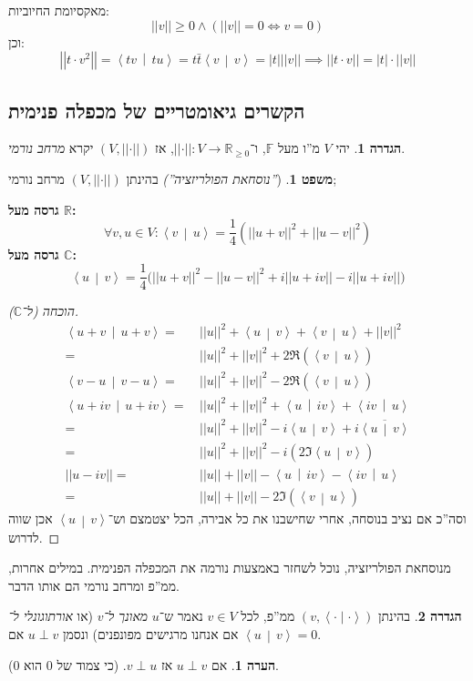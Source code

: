 \documentclass[a4paper]{article}
\newcommand\R     {\mathbb{R}}
\newcommand\C     {\mathbb{C}}
\newcommand\ra    {\rangle}
\newcommand\la    {\langle}
\newcommand\ol    {\overline}
\newcommand\F         {\mathbb{F}}
\newcommand\co        {\colon}
\newcommand\norm[1]   {\left \vert \left \vert #1 \right \vert \right \vert}
\newcommand\snorm     {\left \vert \left \vert \cdot \right \vert \right \vert}
\newcommand\smut      {\left \la \cdot \mid \cdot \right \ra}
\newcommand\mut [2]   {\left \la #1 \,\middle\vert\, #2 \right \ra}
\newcommand\sof[1]    {\left | #1 \right |}
\theoremstyle{definition}
\newtheorem{Theorem}{משפט}
\newtheorem{definition}{הגדרה}
\newtheorem{Remark}{הערה}
\newcommand\theo  [1] {\begin{Theorem}#1\end{Theorem}}
\newcommand\defi  [1] {\begin{definition}#1\end{definition}}
\newcommand\rmark [1] {\begin{Remark}#1\end{Remark}}
\begin{document}
	מאקסיומת החיוביות: 
	\[ \norm{v} \ge 0 \land (\norm{v} = 0 \iff v = 0) \]
	וכן: 
	\[ \norm{t \cdot v^2} = \mut{tv}{tu} = t \bar t\mut{v}{v} = \sof{t}\norm{v} \implies \norm{t \cdot v} = \sof{t} \cdot \norm{v} \]
	
	\newpage
	\subsection{הקשרים גיאומטריים של מכפלה פנימית}
	\defi{יהי $V$ מ''ו מעל $\F$, ו־$\snorm \co V \to \R_{\ge 0}$, אז $(V, \snorm)$ יקרא \textit{מרחב נורמי}. }
	\theo{(\textit{''נוסחאת הפולריזציה'')} בהינתן $(V, \snorm)$ מרחב נורמי;
		
		\textbf{גרסה מעל $\R$: }
		\[ \forall v, u \in V \co \mut{v}{u} = \frac{1}{4}(\norm{u + v}^2 + \norm{u - v}^2) \]
		\textbf{גרסה מעל $\C$: }
		\[ \mut{u}{v} = \frac{1}{4}\Big(\norm{u + v}^2 - \norm{u - v}^2 + i\norm{u + iv} - i\norm{u + iv}\Big) \]
	}
	\begin{proof}[הוכחה (ל־$\C$)]
		\begin{align*}
			\mut{u + v}{u + v} =\,& \norm{u}^2 + \mut{u}{v} + \mut{v}{u} + \norm{v}^2 \\
			=\,& \norm{u}^2 + \norm{v}^2 + 2\Re(\mut{v}{u}) \\
			\mut{v - u}{v - u} = \, & \norm{u}^2 + \norm{v}^2 - 2\Re(\mut{v}{u}) \\
			\mut{u + iv}{u + iv} =\,& \norm{u}^2 + \norm{v}^2 + \mut{u}{iv} + \mut{iv}{u}  \\
			=\,& \norm{u}^2 + \norm{v}^2 - i\mut{u}{v} + i\ol{\mut{u}{v}} \\
			=\,& \norm{u}^2 + \norm{v}^2 - i(2 \Im\mut{u}{v}) \\
			\norm{u - iv} =\,& \norm{u} + \norm{v} - \mut{u}{iv} - \mut{iv}{u} \\
			=\,& \norm{u} + \norm{v} - 2\Im(\mut{v}{u})
		\end{align*}
		וסה''כ אם נציב בנוסחה, אחרי שחישבנו את כל אבירה, הכל יצטמצם וש־$\mut{u}{v}$ אכן שווה לדרוש. 
	\end{proof}
	
	מנוסחאת הפולריזציה, נוכל לשחזר באמצעות נורמה את המכפלה הפנימית. במילים אחרות, ממ''פ ומרחב נורמי הם אותו הדבר. 
	
	\defi{בהינתן $(v, \smut)$ ממ''פ, לכל $v \in V$ נאמר ש־$u$ \textit{מאונך ל־$v$} (או \textit{אורתוגונלי ל־} אם אנחנו מרגישים מפונפנים) ונסמן $u\perp v$ אם $\mut{u}{v} = 0$. }
	
	\rmark{אם $u \perp v$ אז $v \perp u$. (כי צמוד של $0$ הוא $0$). }
	
\end{document}
